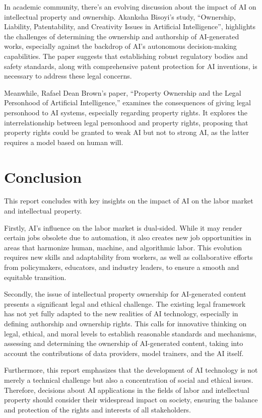 \documentclass[11pt]{article}
\begin{document}
In academic community, there's an evolving discussion about the impact of AI on intellectual property and ownership. Akanksha Bisoyi’s study, “Ownership, Liability, Patentability, and Creativity Issues in Artificial Intelligence”, highlights the challenges of determining the ownership and authorship of AI-generated works, especially against the backdrop of AI's autonomous decision-making capabilities. The paper suggests that establishing robust regulatory bodies and safety standards, along with comprehensive patent protection for AI inventions, is necessary to address these legal concerns.\cite{bisoyi2022ownership}

Meanwhile, Rafael Dean Brown's paper, “Property Ownership and the Legal Personhood of Artificial Intelligence,” examines the consequences of giving legal personhood to AI systems, especially regarding property rights. It explores the interrelationship between legal personhood and property rights, proposing that property rights could be granted to weak AI but not to strong AI, as the latter requires a model based on human will.\cite{brown2021property}

\section{Conclusion}

This report concludes with key insights on the impact of AI on the labor market and intellectual property.

Firstly, AI's influence on the labor market is dual-sided. While it may render certain jobs obsolete due to automation, it also creates new job opportunities in areas that harmonize human, machine, and algorithmic labor. This evolution requires new skills and adaptability from workers, as well as collaborative efforts from policymakers, educators, and industry leaders, to ensure a smooth and equitable transition.

Secondly, the issue of intellectual property ownership for AI-generated content presents a significant legal and ethical challenge. The existing legal framework has not yet fully adapted to the new realities of AI technology, especially in defining authorship and ownership rights. This calls for innovative thinking on legal, ethical, and moral levels to establish reasonable standards and mechanisms, assessing and determining the ownership of AI-generated content, taking into account the contributions of data providers, model trainers, and the AI itself.

Furthermore, this report emphasizes that the development of AI technology is not merely a technical challenge but also a concentration of social and ethical issues. Therefore, decisions about AI applications in the fields of labor and intellectual property should consider their widespread impact on society, ensuring the balance and protection of the rights and interests of all stakeholders. 
\end{document}
